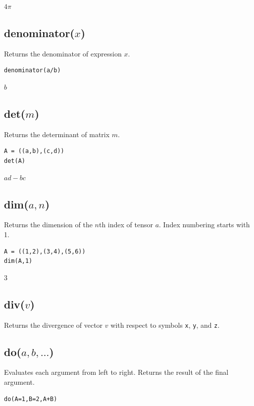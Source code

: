 \documentclass[12pt]{article}
\begin{document}
$4\pi$

\subsection*{denominator($x$)}

Returns the denominator of expression $x$.

{\color{blue}
\begin{verbatim}
denominator(a/b)
\end{verbatim}
}

$b$

\subsection*{det($m$)}

Returns the determinant of matrix $m$.

{\color{blue}
\begin{verbatim}
A = ((a,b),(c,d))
det(A)
\end{verbatim}
}

$a d - b c$

\subsection*{dim($a,n$)}

Returns the dimension of the $n$th index of tensor $a$.
Index numbering starts with 1.

{\color{blue}
\begin{verbatim}
A = ((1,2),(3,4),(5,6))
dim(A,1)
\end{verbatim}
}

$3$

\subsection*{div($v$)}

Returns the divergence of vector $v$ with respect to symbols \verb$x$, \verb$y$, and \verb$z$.

\subsection*{do($a,b,\ldots$)}

Evaluates each argument from left to right.
Returns the result of the final argument.

{\color{blue}
\begin{verbatim}
do(A=1,B=2,A+B)
\end{verbatim}
}
\end{document}
